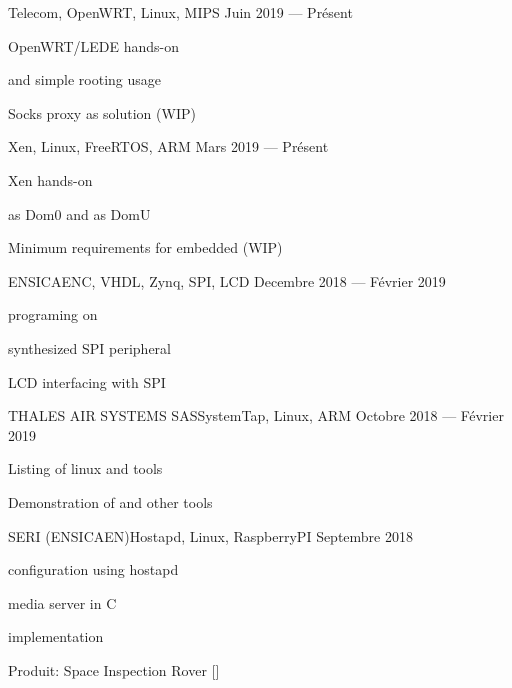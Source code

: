 
        {}{Telecom, OpenWRT, Linux, MIPS}
        {Juin 2019 --- Présent}
        {%
            \begin{additems}
                \item OpenWRT/LEDE  hands-on
                \item {} and simple rooting usage
                \item Socks proxy as  solution (WIP)
            \end{additems}
        }

        {}{Xen, Linux, FreeRTOS, ARM}
        {Mars 2019 --- Présent}
        {%
            \begin{additems}
                \item Xen  hands-on
                \item {} as Dom0 and  as DomU
                \item Minimum requirements for embedded (WIP)
            \end{additems}
        }

        {ENSICAEN}{C, VHDL, Zynq, SPI, LCD}
        {Decembre 2018 --- Février 2019}
        {%
            \begin{additems}
                \item {} programing on 
                \item {} synthesized SPI peripheral
                \item LCD interfacing with SPI
            \end{additems}
        }

        {THALES AIR SYSTEMS SAS}{SystemTap, Linux, ARM}
        {Octobre 2018 --- Février 2019}
        {%
            \begin{additems}
                \item Listing of linux  and  tools
                \item Demonstration of  and other tools
            \end{additems}
        }

        {SERI (ENSICAEN)}{Hostapd, Linux, RaspberryPI}
        {Septembre 2018}
        {%
            \begin{additems}
                \item {} configuration using hostapd
                \item {} media server in C
                \item {} implementation
                \item Produit: Space Inspection Rover []
            \end{additems}
        }
